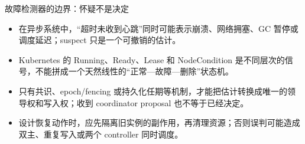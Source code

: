 \documentclass[UTF8,fontset=none,aspectratio=169,10pt]{beamer}
\begin{document}
\begin{frame}{故障检测器的边界：怀疑不是决定}
\small
\begin{itemize}
  \item 在异步系统中，“超时未收到心跳”同时可能表示崩溃、网络拥塞、GC 暂停或调度延迟；suspect 只是一个可撤销的估计。
  \item Kubernetes 的 Running、Ready、Lease 和 NodeCondition 是不同层次的信号，不能拼成一个天然线性的“正常—故障—删除”状态机。
  \item 只有共识、epoch/fencing 或持久化任期等机制，才能把估计转换成唯一的领导权和写入权；收到 coordinator proposal 也不等于已经决定。
  \item 设计恢复动作时，应先隔离旧实例的副作用，再清理资源；否则误判可能造成双主、重复写入或两个 controller 同时调度。
\end{itemize}
\vfill
{}
\end{frame}
\end{document}
